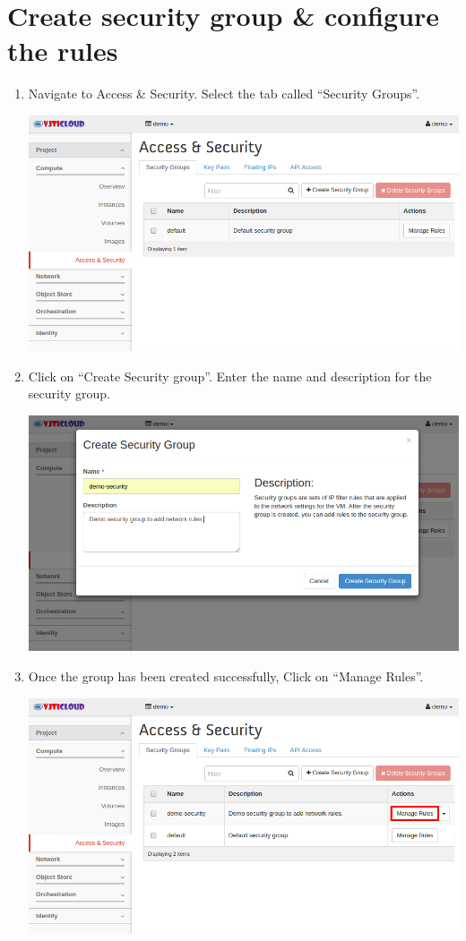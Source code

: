 \documentclass[letterpaper,10pt,english]{sphinxmanual}
\begin{document}
\section{Create security group \& configure the rules}
\label{_source/user_guide/launch_instance:create-security-group}\label{_source/user_guide/launch_instance:create-security-group-configure-the-rules}\begin{enumerate}
\item {} 
Navigate to Access \& Security. Select the tab called “Security Groups”.

\includegraphics{as-access-security.png}

\item {} 
Click on “Create Security group”. Enter the name and description for the security group.

\includegraphics{as-create-security-group.png}

\item {} 
Once the group has been created successfully, Click on “Manage Rules”.

\includegraphics{as-manage-rules.png}


\end{enumerate}
\end{document}
